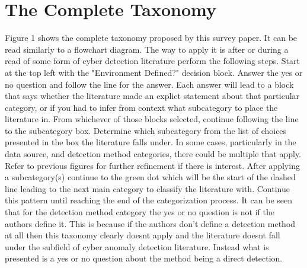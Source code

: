 \section{The Complete Taxonomy}
Figure 1 shows the complete taxonomy proposed by this survey paper. 
It can be read similarly to a flowchart diagram. 
The way to apply it is after or during a read of some form of cyber detection literature perform the following steps. 
Start at the top left with the "Environment Defined?" decision block. Answer the yes or no question and follow the line for the answer. 
Each answer will lead to a block that says whether the literature made an explict statement about that particular category, or if you had to infer from context what subcategory to place the literature in. 
From whichever of those blocks selected, continue following the line to the subcategory box. 
Determine which subcategory from the list of choices presented in the box the literature falls under. 
In some cases, particularly in the data source, and detection method categories, there could be multiple that apply. 
Refer to previous figures for further refinement if there is interest. 
After applying a subcategory(s) continue to the green dot which will be the start of the dashed line leading to the next main category to classify the literature with. 
Continue this pattern until reaching the end of the categorization process.
It can be seen that for the detection method category the yes or no question is not if the authors define it.
This is because if the authors don't define a detection method at all then this taxonomy clearly doesnt apply and the literature doesnt fall under the subfield of cyber anomaly detection literature. 
Instead what is presented is a yes or no question about the method being a direct detection.

